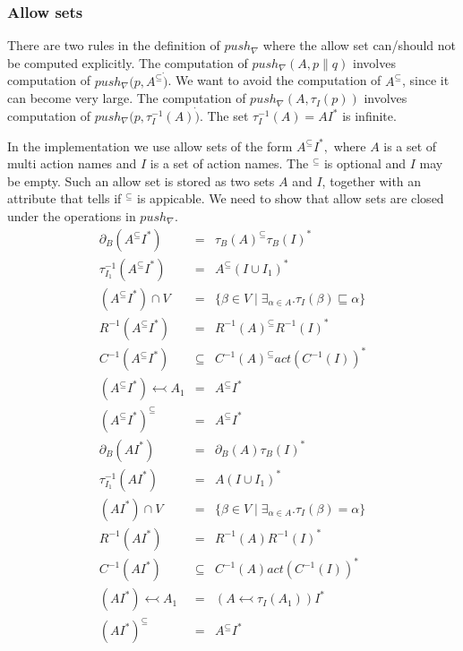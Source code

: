 \documentclass{article}
\begin{document}
\subsubsection{Allow sets}

There are two rules in the definition of $push_{\nabla }$ where the allow
set can/should not be computed explicitly. The computation of $push_{\nabla
}(A,p\parallel q)$ involves computation of $push_{\nabla }(p,A^{\subseteq }%
\dot{)}$. We want to avoid the computation of $A^{\subseteq }$, since it can
become very large. The computation of $push_{\nabla }(A,\tau _{I}(p))$
involves computation of $push_{\nabla }(p,\tau _{I}^{-1}(A)\dot{)}$. The set 
$\tau _{I}^{-1}(A)=AI^{\ast }$ is infinite.

In the implementation we use allow sets of the form $A^{\subseteq }I^{\ast
}, $ where $A$ is a set of multi action names and $I$ is a set of action
names. The $^{\subseteq }$ is optional and $I$ may be empty. Such an allow
set is stored as two sets $A$ and $I$, together with an attribute that tells
if $^{\subseteq }$ is appicable. We need to show that allow sets are closed
under the operations in $push_{\nabla }$.%
\[
\begin{array}{lll}
\partial _{B}(A^{\subseteq }I^{\ast }) & = & \tau _{B}(A)^{\subseteq }\tau
_{B}(I)^{\ast } \\ 
\tau _{I_{1}}^{-1}\left( A^{\subseteq }I^{\ast }\right) & = & A^{\subseteq
}\left( I\cup I_{1}\right) ^{\ast } \\ 
\left( A^{\subseteq }I^{\ast }\right) \cap V & = & \{\beta \in V\mid \exists
_{\alpha \in A}.\tau _{I}(\beta )\sqsubseteq \alpha \} \\ 
R^{-1}\left( A^{\subseteq }I^{\ast }\right) & = & R^{-1}\left( A\right)
^{\subseteq }R^{-1}\left( I\right) ^{\ast } \\ 
C^{-1}\left( A^{\subseteq }I^{\ast }\right) & \subseteq & C^{-1}\left(
A\right) ^{\subseteq }act\left( C^{-1}\left( I\right) \right) ^{\ast } \\ 
\left( A^{\subseteq }I^{\ast }\right) \leftarrowtail A_{1} & = & 
A^{\subseteq }I^{\ast } \\ 
\left( A^{\subseteq }I^{\ast }\right) ^{\subseteq } & = & A^{\subseteq
}I^{\ast } \\ 
\partial _{B}(AI^{\ast }) & = & \partial _{B}(A)\tau _{B}(I)^{\ast } \\ 
\tau _{I_{1}}^{-1}\left( AI^{\ast }\right) & = & A\left( I\cup I_{1}\right)
^{\ast } \\ 
\left( AI^{\ast }\right) \cap V & = & \{\beta \in V\mid \exists _{\alpha \in
A}.\tau _{I}(\beta )=\alpha \} \\ 
R^{-1}\left( AI^{\ast }\right) & = & R^{-1}\left( A\right) R^{-1}\left(
I\right) ^{\ast } \\ 
C^{-1}\left( AI^{\ast }\right) & \subseteq & C^{-1}\left( A\right) act\left(
C^{-1}\left( I\right) \right) ^{\ast } \\ 
\left( AI^{\ast }\right) \leftarrowtail A_{1} & = & \left( A\leftarrowtail
\tau _{I}(A_{1})\right) I^{\ast } \\ 
\left( AI^{\ast }\right) ^{\subseteq } & = & A^{\subseteq }I^{\ast }%
\end{array}%
\]%
\end{document}
